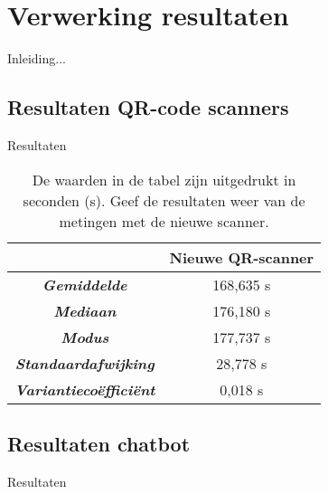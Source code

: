 
\chapter{Verwerking resultaten}%
\label{ch:verwerkingresultaten}

Inleiding...


\section{Resultaten QR-code scanners}
\label{resultatenQR-codeScanners}

Resultaten

\begin{table}[h]
    \centering
    \begin{tabular}{ |c|c| }
        \hline
        \multicolumn{1}{|c|}{} & \textbf{Nieuwe QR-scanner} \\       
        \hline
        \textbf{\textit{Gemiddelde}} & 168,635 s \\
        \hline
        \textbf{\textit{Mediaan}} & 176,180 s \\
        \hline
        \textbf{\textit{Modus}} & 177,737 s \\
        \hline
        \textbf{\textit{Standaardafwijking}} & 28,778 s \\
        \hline
        \textbf{\textit{Variantiecoëfficiënt}} & 0,018 s \\
        \hline
    \end{tabular}
    \captionsetup{justification=centering}
    \caption{De waarden in de tabel zijn uitgedrukt in seconden (s). Geef de resultaten weer van de metingen met de nieuwe scanner.}
    \label{tab:nieuweScanner}
\end{table}


\section{Resultaten chatbot}
\label{resultatenChatbot}

Resultaten


